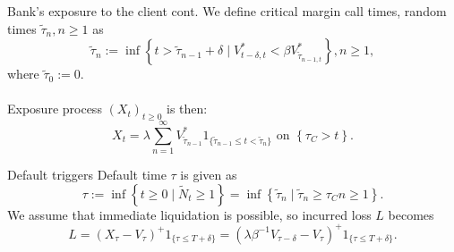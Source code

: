 \documentclass[compress, 10pt, notes]{beamer}  %
\begin{document}
\begin{frame}{Bank's exposure to the client cont.}
    We define critical margin call times, random times $\widetilde{\tau}_n, n\geq 1$ as
    \begin{equation*}
    \widetilde{\tau}_n := \inf \left\{ t > \widetilde{\tau}_{n-1} + \delta \mid V^*_{t-\delta, t} < \beta V^*_{\widetilde{\tau}_{n-1,t}} \right\}, n \geq 1,
    \end{equation*}
    where $\widetilde{\tau}_0 := 0.$ \\~\\
    Exposure process $\left ( X_t \right )_{t \geq 0}$ is then:
    \begin{equation*}
        X_t = \lambda \sum_{n=1}^{\infty} V^*_{\widetilde{\tau}_{n-1}}1_{\{\widetilde{\tau}_{n-1}\leq t <\widetilde{\tau}_n\}} \text{ on } \left\{ \tau_C > t \right\}.
    \end{equation*}
\end{frame}

\begin{frame}{Default triggers}
    Default time $\tau$ is given as
    \begin{equation*}
        \tau := \inf \left\{ t \geq 0 \mid \widetilde{N}_t \geq 1 \right\} = \inf \left\{ \widetilde{\tau}_n \mid \widetilde{\tau}_n \geq \tau_C n \geq 1 \right\}.
    \end{equation*}
    We assume that immediate liquidation is possible, so incurred loss $L$ becomes
    \begin{equation*}
        L = \left( X_\tau - V_\tau \right)^+ 1_{\{\tau \leq T + \delta\}} = \left( \lambda \beta^{-1} V_{\tau-\delta} - V_\tau \right)^+ 1_{\{\tau\leq T+\delta\}}.
    \end{equation*}
\end{frame}

\end{document}
